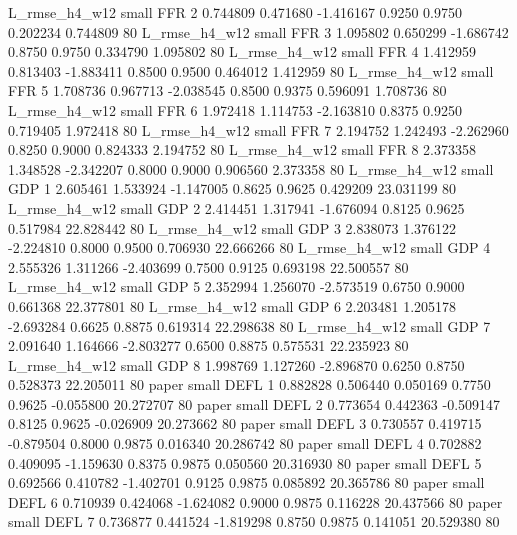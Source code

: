 L_rmse_h4_w12      small      FFR                 2 0.744809 0.471680 -1.416167 0.9250 0.9750  0.202234    0.744809 80
L_rmse_h4_w12      small      FFR                 3 1.095802 0.650299 -1.686742 0.8750 0.9750  0.334790    1.095802 80
L_rmse_h4_w12      small      FFR                 4 1.412959 0.813403 -1.883411 0.8500 0.9500  0.464012    1.412959 80
L_rmse_h4_w12      small      FFR                 5 1.708736 0.967713 -2.038545 0.8500 0.9375  0.596091    1.708736 80
L_rmse_h4_w12      small      FFR                 6 1.972418 1.114753 -2.163810 0.8375 0.9250  0.719405    1.972418 80
L_rmse_h4_w12      small      FFR                 7 2.194752 1.242493 -2.262960 0.8250 0.9000  0.824333    2.194752 80
L_rmse_h4_w12      small      FFR                 8 2.373358 1.348528 -2.342207 0.8000 0.9000  0.906560    2.373358 80
L_rmse_h4_w12      small      GDP                 1 2.605461 1.533924 -1.147005 0.8625 0.9625  0.429209   23.031199 80
L_rmse_h4_w12      small      GDP                 2 2.414451 1.317941 -1.676094 0.8125 0.9625  0.517984   22.828442 80
L_rmse_h4_w12      small      GDP                 3 2.838073 1.376122 -2.224810 0.8000 0.9500  0.706930   22.666266 80
L_rmse_h4_w12      small      GDP                 4 2.555326 1.311266 -2.403699 0.7500 0.9125  0.693198   22.500557 80
L_rmse_h4_w12      small      GDP                 5 2.352994 1.256070 -2.573519 0.6750 0.9000  0.661368   22.377801 80
L_rmse_h4_w12      small      GDP                 6 2.203481 1.205178 -2.693284 0.6625 0.8875  0.619314   22.298638 80
L_rmse_h4_w12      small      GDP                 7 2.091640 1.164666 -2.803277 0.6500 0.8875  0.575531   22.235923 80
L_rmse_h4_w12      small      GDP                 8 1.998769 1.127260 -2.896870 0.6250 0.8750  0.528373   22.205011 80
        paper      small     DEFL                 1 0.882828 0.506440  0.050169 0.7750 0.9625 -0.055800   20.272707 80
        paper      small     DEFL                 2 0.773654 0.442363 -0.509147 0.8125 0.9625 -0.026909   20.273662 80
        paper      small     DEFL                 3 0.730557 0.419715 -0.879504 0.8000 0.9875  0.016340   20.286742 80
        paper      small     DEFL                 4 0.702882 0.409095 -1.159630 0.8375 0.9875  0.050560   20.316930 80
        paper      small     DEFL                 5 0.692566 0.410782 -1.402701 0.9125 0.9875  0.085892   20.365786 80
        paper      small     DEFL                 6 0.710939 0.424068 -1.624082 0.9000 0.9875  0.116228   20.437566 80
        paper      small     DEFL                 7 0.736877 0.441524 -1.819298 0.8750 0.9875  0.141051   20.529380 80
